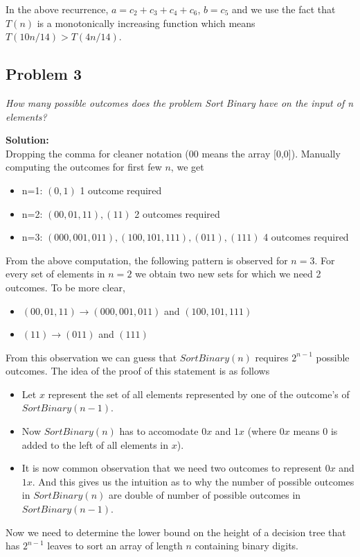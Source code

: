 \documentclass[12pt,a4paper]{article}
\newcommand{\solution}{\noindent\textbf{Solution:}\\\indent}
\begin{document}
In the above recurrence, $a = c_2+c_3+c_4+c_6$, $b=c_5$ and we use the fact that $T(n)$ is a monotonically increasing function which means $T(10n/14) > T(4n/14)$.

\newpage
\subsection*{Problem 3}
\textit{
    How many possible outcomes does the problem Sort Binary have on the input of n elements?
}

\solution
Dropping the comma for cleaner notation (00 means the array [0,0]). Manually computing the outcomes for first few $n$, we get
\begin{itemize}
    \item n=1: $(0,1)$ 1 outcome required
    \item n=2: $(00, 01, 11), (11)$ 2 outcomes required
    \item n=3: $(000,001,011), (100, 101, 111), (011), (111)$ 4 outcomes required
\end{itemize}

From the above computation, the following pattern is observed for $n=3$. For every set of elements in $n=2$ we obtain two new sets for which we need 2 outcomes. To be more clear,
\begin{itemize}
    \item $(00, 01, 11) \rightarrow (000, 001, 011)$ and $(100, 101, 111)$
    \item $(11) \rightarrow (011)$ and $(111)$
\end{itemize}

From this observation we can guess that $SortBinary(n)$ requires $2^{n-1}$ possible outcomes. The idea of the proof of this statement is as follows
\begin{itemize}
    \item Let $x$ represent the set of all elements represented by one of the outcome's of $SortBinary(n-1)$.
    \item Now $SortBinary(n)$ has to accomodate $0x$ and $1x$ (where $0x$ means $0$ is added to the left of all elements in $x$).
    \item It is now common observation that we need two outcomes to represent $0x$ and $1x$. And this gives us the intuition as to why the number of possible outcomes in $SortBinary(n)$ are double of number of possible outcomes in $SortBinary(n-1)$. 
\end{itemize}

Now we need to determine the lower bound on the height of a decision tree that has $2^{n-1}$ leaves to sort an array of length $n$ containing binary digits.
\end{document}
